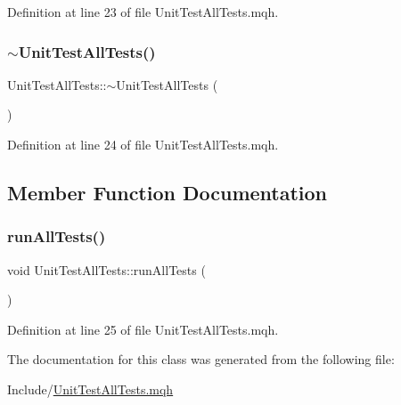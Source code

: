 Definition at line 23 of file Unit\+Test\+All\+Tests.\+mqh.

\mbox{\label{class_unit_test_all_tests_a0d8b99f5e3a4c6c88c97a33c6aa730f1}} 
\subsubsection{\texorpdfstring{$\sim$\+Unit\+Test\+All\+Tests()}{~UnitTestAllTests()}}
{\footnotesize\ttfamily Unit\+Test\+All\+Tests\+::$\sim$\+Unit\+Test\+All\+Tests (\begin{DoxyParamCaption}{ }\end{DoxyParamCaption})\hspace{0.3cm}{\ttfamily [inline]}}



Definition at line 24 of file Unit\+Test\+All\+Tests.\+mqh.



\subsection{Member Function Documentation}
\mbox{\label{class_unit_test_all_tests_aa68ce4d1bc5a5a49fcfe1ee1e50f2c5e}} 
\subsubsection{\texorpdfstring{run\+All\+Tests()}{runAllTests()}}
{\footnotesize\ttfamily void Unit\+Test\+All\+Tests\+::run\+All\+Tests (\begin{DoxyParamCaption}{ }\end{DoxyParamCaption})\hspace{0.3cm}{\ttfamily [inline]}}



Definition at line 25 of file Unit\+Test\+All\+Tests.\+mqh.



The documentation for this class was generated from the following file\+:\begin{DoxyCompactItemize}
\item 
Include/\mbox{\hyperlink{_unit_test_all_tests_8mqh}{Unit\+Test\+All\+Tests.\+mqh}}\end{DoxyCompactItemize}
